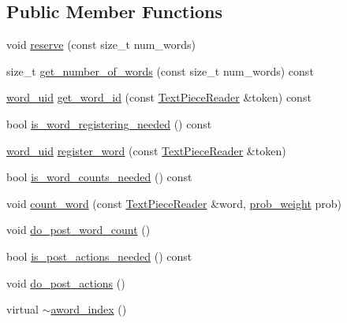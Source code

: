 \subsection*{Public Member Functions}
\begin{DoxyCompactItemize}
\item 
void \hyperlink{classuva_1_1smt_1_1bpbd_1_1server_1_1lm_1_1dictionary_1_1aword__index_a7d7be9ae362d430168ffee3e5ee29d19}{reserve} (const size\+\_\+t num\+\_\+words)
\item 
size\+\_\+t \hyperlink{classuva_1_1smt_1_1bpbd_1_1server_1_1lm_1_1dictionary_1_1aword__index_a2cd9869585cb021307aeac99f4a3c4b0}{get\+\_\+number\+\_\+of\+\_\+words} (const size\+\_\+t num\+\_\+words) const 
\item 
\hyperlink{namespaceuva_1_1smt_1_1bpbd_1_1server_a6bfe45ba344d65a7fdd7d26156328ddc}{word\+\_\+uid} \hyperlink{classuva_1_1smt_1_1bpbd_1_1server_1_1lm_1_1dictionary_1_1aword__index_abb62e2b8b8ff0ac22994c85847579bed}{get\+\_\+word\+\_\+id} (const \hyperlink{classuva_1_1utils_1_1file_1_1_text_piece_reader}{Text\+Piece\+Reader} \&token) const 
\item 
bool \hyperlink{classuva_1_1smt_1_1bpbd_1_1server_1_1lm_1_1dictionary_1_1aword__index_a9e7b2c33607674f174e9847d3c84a8ae}{is\+\_\+word\+\_\+registering\+\_\+needed} () const 
\item 
\hyperlink{namespaceuva_1_1smt_1_1bpbd_1_1server_a6bfe45ba344d65a7fdd7d26156328ddc}{word\+\_\+uid} \hyperlink{classuva_1_1smt_1_1bpbd_1_1server_1_1lm_1_1dictionary_1_1aword__index_a6151a3208a60744f9019a8e848c7f35b}{register\+\_\+word} (const \hyperlink{classuva_1_1utils_1_1file_1_1_text_piece_reader}{Text\+Piece\+Reader} \&token)
\item 
bool \hyperlink{classuva_1_1smt_1_1bpbd_1_1server_1_1lm_1_1dictionary_1_1aword__index_a9daa2e0472ae75f8747810a1a9165bce}{is\+\_\+word\+\_\+counts\+\_\+needed} () const 
\item 
void \hyperlink{classuva_1_1smt_1_1bpbd_1_1server_1_1lm_1_1dictionary_1_1aword__index_aa9d7e1c248fd29cd35abe4d51fda633c}{count\+\_\+word} (const \hyperlink{classuva_1_1utils_1_1file_1_1_text_piece_reader}{Text\+Piece\+Reader} \&word, \hyperlink{namespaceuva_1_1smt_1_1bpbd_1_1server_a01e9ea4de9c226f4464862e84ff0bbcc}{prob\+\_\+weight} prob)
\item 
void \hyperlink{classuva_1_1smt_1_1bpbd_1_1server_1_1lm_1_1dictionary_1_1aword__index_a9aa515706b0bdd2162aeabb61a38011d}{do\+\_\+post\+\_\+word\+\_\+count} ()
\item 
bool \hyperlink{classuva_1_1smt_1_1bpbd_1_1server_1_1lm_1_1dictionary_1_1aword__index_a3966d5e5839c475942276384b4d527af}{is\+\_\+post\+\_\+actions\+\_\+needed} () const 
\item 
void \hyperlink{classuva_1_1smt_1_1bpbd_1_1server_1_1lm_1_1dictionary_1_1aword__index_a43c16e38c7aa218b08bb548e7531c3bd}{do\+\_\+post\+\_\+actions} ()
\item 
virtual \hyperlink{classuva_1_1smt_1_1bpbd_1_1server_1_1lm_1_1dictionary_1_1aword__index_af71a1227aeb8a4b2b013c0006732d1fb}{$\sim$aword\+\_\+index} ()
\end{DoxyCompactItemize}
